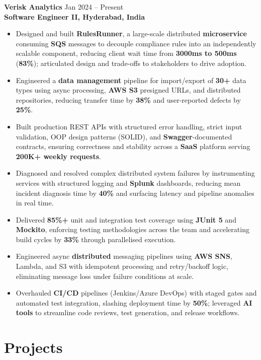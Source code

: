 \documentclass[a4paper,10pt]{article}
\begin{document}
\textbf{Verisk Analytics} \hfill Jan 2024 -- Present \\
\textbf{Software Engineer II, Hyderabad, India}
\begin{itemize}[leftmargin=*]
    \item Designed and built \textbf{RulesRunner}, a large-scale distributed \textbf{microservice} consuming \textbf{SQS} messages to decouple compliance rules into an independently scalable component, reducing client wait time from \textbf{3000ms to 500ms} (\textbf{83\%}); articulated design and trade-offs to stakeholders to drive adoption.
    \item Engineered a \textbf{data management} pipeline for import/export of \textbf{30+} data types using async processing, \textbf{AWS S3} presigned URLs, and distributed repositories, reducing transfer time by \textbf{38\%} and user-reported defects by \textbf{25\%}.
    \item Built production REST APIs with structured error handling, strict input validation, OOP design patterns (SOLID), and \textbf{Swagger}-documented contracts, ensuring correctness and stability across a \textbf{SaaS} platform serving \textbf{200K+ weekly requests}.
    \item Diagnosed and resolved complex distributed system failures by instrumenting services with structured logging and \textbf{Splunk} dashboards, reducing mean incident diagnosis time by \textbf{40\%} and surfacing latency and pipeline anomalies in real time.
    \item Delivered \textbf{85\%+} unit and integration test coverage using \textbf{JUnit 5} and \textbf{Mockito}, enforcing testing methodologies across the team and accelerating build cycles by \textbf{33\%} through parallelised execution.
    \item Engineered async \textbf{distributed} messaging pipelines using \textbf{AWS SNS}, Lambda, and S3 with idempotent processing and retry/backoff logic, eliminating message loss under failure conditions at scale.
    \item Overhauled \textbf{CI/CD} pipelines (Jenkins/Azure DevOps) with staged gates and automated test integration, slashing deployment time by \textbf{50\%}; leveraged \textbf{AI tools} to streamline code reviews, test generation, and release workflows.
\end{itemize}

\section*{Projects}
\end{document}
